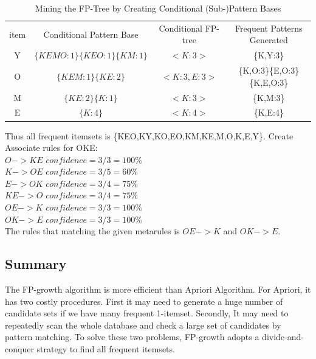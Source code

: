 \documentclass[11pt]{article} %
\begin{document}
\begin{table}[htdp]
\caption{Mining the FP-Tree by Creating Conditional (Sub-)Pattern Bases}
\begin{tabular}{|c|c|c|c|}
item & Conditional Pattern Base & Conditional FP-tree & Frequent Patterns Generated\\
Y & $\{KEMO:1\}\{KEO:1\}\{KM:1\}$ & $<K:3>$ & \{K,Y:3\}\\
O & $\{KEM:1\}\{KE:2\}$ & $<K:3, E:3>$ & \{K,O:3\}\{E,O:3\}\{K,E,O:3\}\\
M & $\{KE:2\}\{K:1\}$ & $<K:3>$ & \{K,M:3\}\\
E & $\{K:4\}$ & $<K:4>$ & \{K,E:4\}\\
\end{tabular}
\label{default}
\end{table}
Thus all frequent itemsets is \{KEO,KY,KO,EO,KM,KE,M,O,K,E,Y\}. Create Associate rules for OKE:\\
$O -> KE$ $confidence= 3/3 = 100\%$\\
$K -> OE$ $confidence= 3/5 = 60\%$\\
$E -> OK$ $confidence= 3/4 = 75\%$\\
$KE -> O$ $confidence= 3/4 = 75\%$\\
$OE -> K$ $confidence= 3/3 = 100\%$\\
$OK -> E$ $confidence= 3/3 = 100\%$\\
The rules that matching the given metarules is $OE -> K$ and $OK -> E$.
\subsection{Summary}
The FP-growth algorithm is more efficient than Apriori Algorithm. For Apriori, it has two costly procedures. First it may need to generate a huge number of candidate sets if we have many frequent 1-itemset. Secondly, It may need to repeatedly scan the whole database and check a large set of candidates by pattern matching. To solve these two problems, FP-growth adopts a divide-and-conquer strategy to find all frequent itemsets.
\end{document}
